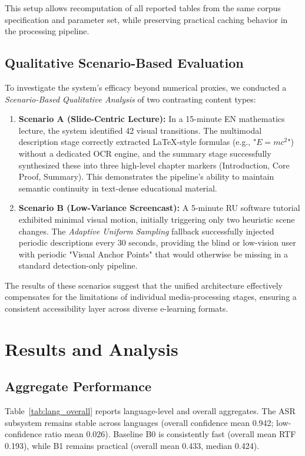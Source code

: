 \documentclass[conference]{IEEEtran}
\begin{document}
This setup allows recomputation of all reported tables from the same corpus specification and parameter set, while preserving practical caching behavior in the processing pipeline.

\subsection{Qualitative Scenario-Based Evaluation}
To investigate the system's efficacy beyond numerical proxies, we conducted a \emph{Scenario-Based Qualitative Analysis} of two contrasting content types:
\begin{enumerate}
\item \textbf{Scenario A (Slide-Centric Lecture):} In a 15-minute EN mathematics lecture, the system identified 42 visual transitions. The multimodal description stage correctly extracted LaTeX-style formulas (e.g., "$E=mc^2$") without a dedicated OCR engine, and the summary stage successfully synthesized these into three high-level chapter markers (Introduction, Core Proof, Summary). This demonstrates the pipeline's ability to maintain semantic continuity in text-dense educational material.
\item \textbf{Scenario B (Low-Variance Screencast):} A 5-minute RU software tutorial exhibited minimal visual motion, initially triggering only two heuristic scene changes. The \emph{Adaptive Uniform Sampling} fallback successfully injected periodic descriptions every 30 seconds, providing the blind or low-vision user with periodic "Visual Anchor Points" that would otherwise be missing in a standard detection-only pipeline.
\end{enumerate}

The results of these scenarios suggest that the unified architecture effectively compensates for the limitations of individual media-processing stages, ensuring a consistent accessibility layer across diverse e-learning formats.

\FloatBarrier
\section{Results and Analysis}
\subsection{Aggregate Performance}
Table~\ref{tab:lang_overall} reports language-level and overall aggregates. The ASR subsystem remains stable across languages (overall confidence mean 0.942; low-confidence ratio mean 0.026). Baseline B0 is consistently fast (overall mean RTF 0.193), while B1 remains practical (overall mean 0.433, median 0.424).
\end{document}
